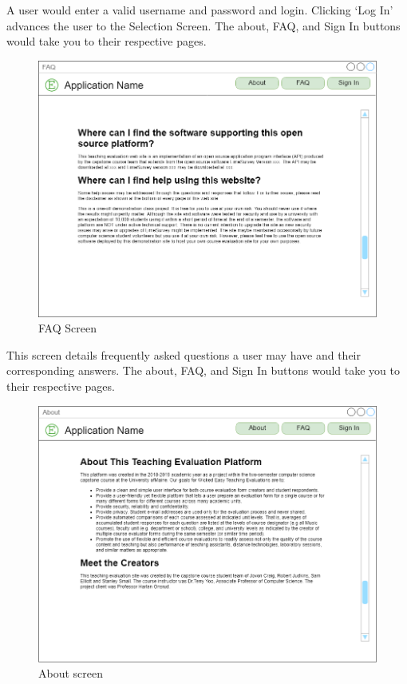 \documentclass{article}
\begin{document}
A user would enter a valid username and password and login. Clicking `Log In' advances the user to the Selection Screen.  The about, FAQ, and Sign In buttons would take you to their respective pages.

\begin{center}
\begin{figure}[H]
    \centering
    \caption{FAQ Screen}
    \includegraphics[scale=.35]{images/faq_screen.png}
\end{figure}
\end{center}

This screen details frequently asked questions a user may have and their corresponding answers. The about, FAQ, and Sign In buttons would take you to their respective pages.

\begin{center}
\begin{figure}[H]
    \centering
    \caption{About screen}
    \includegraphics[scale=.35]{images/about_screen.png}
\end{figure}
\end{center}
\end{document}
